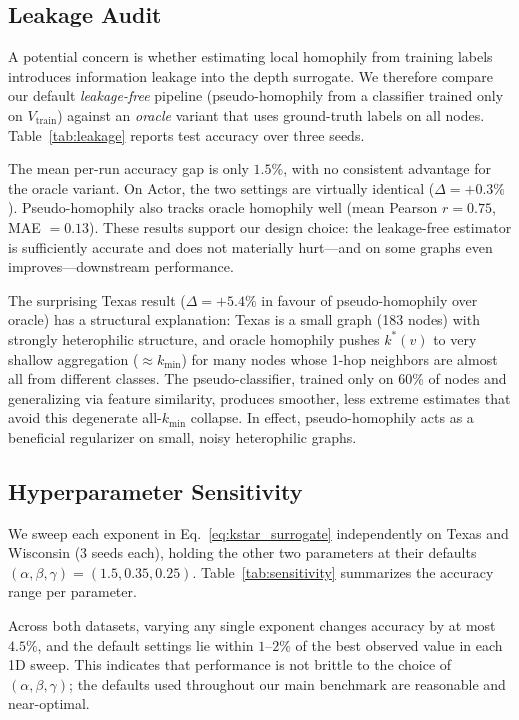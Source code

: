 \documentclass[letterpaper]{article}
\begin{document}
\subsection{Leakage Audit}
\label{sec:leakage}
A potential concern is whether estimating local homophily from training labels introduces information leakage into the depth surrogate. We therefore compare our default \emph{leakage-free} pipeline (pseudo-homophily from a classifier trained only on $V_{\mathrm{train}}$) against an \emph{oracle} variant that uses ground-truth labels on all nodes. Table~\ref{tab:leakage} reports test accuracy over three seeds.

The mean per-run accuracy gap is only $1.5\%$, with no consistent advantage for the oracle variant. On Actor, the two settings are virtually identical ($\Delta = +0.3\%$). Pseudo-homophily also tracks oracle homophily well (mean Pearson $r = 0.75$, MAE $= 0.13$). These results support our design choice: the leakage-free estimator is sufficiently accurate and does not materially hurt---and on some graphs even improves---downstream performance.

The surprising Texas result ($\Delta = +5.4\%$ in favour of pseudo-homophily over oracle) has a structural explanation: Texas is a small graph (183 nodes) with strongly heterophilic structure, and oracle homophily pushes $k^*(v)$ to very shallow aggregation ($\approx k_{\min}$) for many nodes whose 1-hop neighbors are almost all from different classes. The pseudo-classifier, trained only on 60\% of nodes and generalizing via feature similarity, produces smoother, less extreme estimates that avoid this degenerate all-$k_{\min}$ collapse. In effect, pseudo-homophily acts as a beneficial regularizer on small, noisy heterophilic graphs.

\subsection{Hyperparameter Sensitivity}
\label{sec:sensitivity}
We sweep each exponent in Eq.~\eqref{eq:kstar_surrogate} independently on Texas and Wisconsin (3 seeds each), holding the other two parameters at their defaults $(\alpha, \beta, \gamma) = (1.5, 0.35, 0.25)$. Table~\ref{tab:sensitivity} summarizes the accuracy range per parameter.

Across both datasets, varying any single exponent changes accuracy by at most $4.5\%$, and the default settings lie within $1$--$2\%$ of the best observed value in each 1D sweep. This indicates that performance is not brittle to the choice of $(\alpha, \beta, \gamma)$; the defaults used throughout our main benchmark are reasonable and near-optimal.
\end{document}
